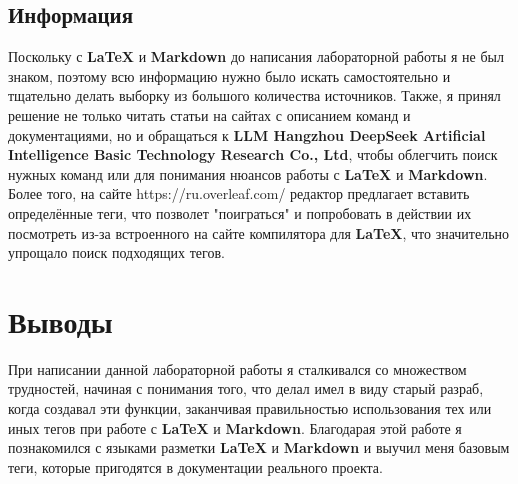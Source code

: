 \documentclass{article}
\begin{document}
    \subsection*{Информация}
        Поскольку с \textbf{LaTeX} и \textbf{Markdown} до написания лабораторной работы я не был знаком, поэтому всю информацию нужно было искать самостоятельно и тщательно делать выборку из большого количества источников. Также, я принял решение не только читать статьи на сайтах с описанием команд и документациями, но и обращаться к \textbf{LLM Hangzhou DeepSeek Artificial Intelligence Basic Technology Research Co., Ltd}, чтобы облегчить поиск нужных команд или для понимания нюансов работы с \textbf{LaTeX} и \textbf{Markdown}. Более того, на сайте https://ru.overleaf.com/ редактор предлагает вставить определённые теги, что позволет "поиграться" и попробовать в действии их посмотреть из-за встроенного на сайте компилятора для \textbf{LaTeX}, что значительно упрощало поиск подходящих тегов.
    


\hrulefill

\section{Выводы}
    
    \large{При написании данной лабораторной работы я сталкивался со множеством трудностей, начиная с понимания того, что делал имел в виду старый разраб, когда создавал эти функции, заканчивая правильностью использования тех или иных тегов при работе с \textbf{LaTeX} и \textbf{Markdown}. Благодарая этой работе я познакомился с языками разметки \textbf{LaTeX} и \textbf{Markdown} и выучил меня базовым теги, которые пригодятся в документации реального проекта.}
    

\end{document}

